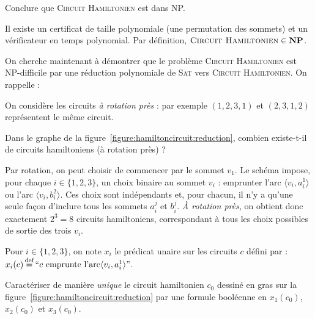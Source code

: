 \begin{exercice}[\textsc{Circuit Hamiltonien} est NP-complet%
    \footnote{Vidéo détaillée de la réduction de \textsc{3-SAT} à \textsc{Cycle Hamiltonien} : \url{https://www.youtube.com/watch?v=OHnX-R_SBpM}}]
  \begin{questions}
  \item Conclure que \textsc{Circuit Hamiltonien} est dans NP.
  \end{questions}
  \begin{corrections}
    Il existe un certificat de taille polynomiale (une permutation des sommets) et un vérificateur en temps polynomial.  
    Par définition, $\textsc{Circuit Hamiltonien} \in \mathbf{NP}$.
  \end{corrections}

  \ifnotcorrection{\pagebreak}
  On cherche maintenant à démontrer que le problème \textsc{Circuit Hamiltonien} est NP-difficile par une réduction polynomiale de \textsc{Sat} vers \textsc{Circuit Hamiltonien}.
  On rappelle :


  On considère les circuits \emph{à rotation près} : par exemple $(1,2,3,1)$ et $(2,3,1,2)$ représentent le même circuit.

  \ifcorrection{\newpage}
  \begin{questions}
  \item Dans le graphe de la figure~\ref{figure:hamiltoncircuit:reduction}, combien existe-t-il de circuits hamiltoniens (à rotation près) ? 
  \end{questions}
  \begin{corrections}
    Par rotation, on peut choisir de commencer par le sommet $v_1$. Le schéma impose, pour chaque $i\in\{1,2,3\}$,
    un choix binaire au sommet $v_i$ : emprunter l'arc $\langle v_i,a_i^1\rangle$ ou l'arc $\langle v_i, b_i^2\rangle$.  
    Ces choix sont indépendants et, pour chacun, il n'y a qu'une seule façon d'inclure tous les sommets $a_i^j$ et $b_i^j$. 
    \emph{À rotation près}, on obtient donc exactement $2^3=8$ circuits hamiltoniens,
    correspondant à tous les choix possibles de sortie des trois $v_i$.
  \end{corrections}
  
  Pour $i \in \{1,2,3\}$, on note $x_i$ le prédicat unaire sur les circuits $c$ défini par :
  $x_i(c) \operatorname{\stackrel{\text{def}}{=}} ``\text{$c$ emprunte l'arc}\langle v_i, a_i^1\rangle"$.

  \begin{questions}
  \item Caractériser de manière \emph{unique} le circuit hamiltonien $c_0$ dessiné en gras sur la figure~\ref{figure:hamiltoncircuit:reduction}
    par une formule booléenne en $x_1(c_0)$, $x_2(c_0)$ et $x_3(c_0)$.
  \end{questions}


\end{exercice}
